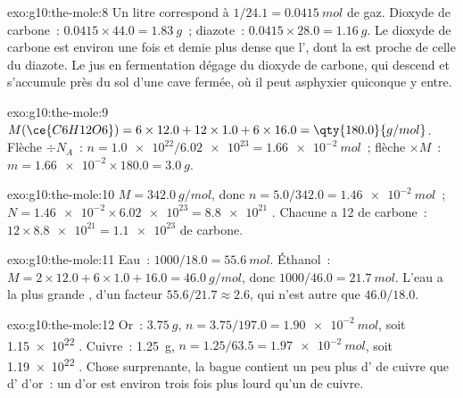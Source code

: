 \begin{solution}{exo:g10:the-mole:8}
Un litre correspond à $1/24.1 = \qty{0.0415}{mol}$ de gaz. Dioxyde de
carbone~: $0.0415 \times 44.0 = \qty{1.83}{g}$~; diazote~:
$0.0415 \times 28.0 = \qty{1.16}{g}$. Le dioxyde de carbone est environ
une fois et demie plus dense que l', dont la  est proche
de celle du diazote. Le jus en fermentation dégage du dioxyde de
carbone, qui descend et s'accumule près du sol d'une cave fermée, où il
peut asphyxier quiconque y entre.
\end{solution}

\begin{solution}{exo:g10:the-mole:9}
$M(\ce{C6H12O6}) = 6 \times 12.0 + 12 \times 1.0 + 6 \times 16.0 =
\qty{180.0}{g/mol}$. Flèche $\div N_A$~: $n = \num{1.0e22} / \num{6.02e23} =
\qty{1.66e-2}{mol}$~; flèche $\times M$~: $m = \num{1.66e-2} \times 180.0 =
\qty{3.0}{g}$.
\end{solution}

\begin{solution}{exo:g10:the-mole:10}
$M = \qty{342.0}{g/mol}$, donc $n = 5.0 / 342.0 = \qty{1.46e-2}{mol}$~;
$N = \num{1.46e-2} \times \num{6.02e23} = \num{8.8e21}$ .
Chacune a 12  de carbone~: $12 \times \num{8.8e21} = \num{1.1e23}$
 de carbone.
\end{solution}

\begin{solution}{exo:g10:the-mole:11}
Eau~: $1000 / 18.0 = \qty{55.6}{mol}$. Éthanol~:
$M = 2 \times 12.0 + 6 \times 1.0 + 16.0 = \qty{46.0}{g/mol}$, donc
$1000 / 46.0 = \qty{21.7}{mol}$. L'eau a la plus grande , d'un facteur $55.6 / 21.7 \approx 2.6$, qui n'est autre que
$46.0 / 18.0$.
\end{solution}

\begin{solution}{exo:g10:the-mole:12}
Or~: $\qty{3.75}{g}$, $n = 3.75 / 197.0 = \qty{1.90e-2}{mol}$, soit
\num{1.15e22} . Cuivre~: \qty{1.25}{g},
$n = 1.25 / 63.5 = \qty{1.97e-2}{mol}$, soit \num{1.19e22} .
Chose surprenante, la bague contient un peu plus d' de cuivre que
d' d'or~: un  d'or est environ trois fois plus lourd qu'un
 de cuivre.
\end{solution}

